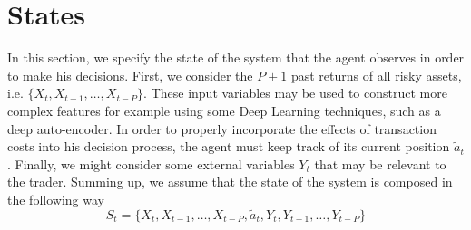 \section{States}
In this section, we specify the state of the system that the agent observes in
order to make his decisions. First, we consider the $P+1$ past returns of all
risky assets, i.e. $\{X_t, X_{t-1}, \ldots, X_{t-P}\}$. These input variables
may be used to construct more complex features for example using some Deep
Learning techniques, such as a deep auto-encoder. In order to properly 
incorporate the effects of transaction costs into his decision process, the
agent must keep track of its current position $\tilde{a}_t$. Finally, we might
consider some external variables $Y_t$ that may be relevant to the trader.
Summing up, we assume that the state of the system is composed in the following
way 
\begin{equation}
	S_t = \{X_t, X_{t-1}, \ldots, X_{t-P}, \tilde{a}_t, Y_t, Y_{t-1}, \ldots,
	Y_{t-P}\}
\end{equation}

